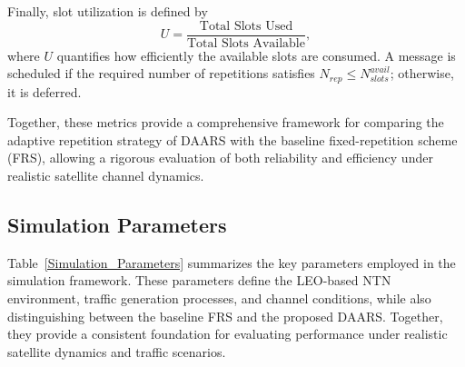 \documentclass[conference]{IEEEtran}
\begin{document}
Finally, slot utilization is defined by
\begin{equation}
U = \frac{\text{Total Slots Used}}{\text{Total Slots Available}},
\end{equation}
where $U$ quantifies how efficiently the available slots are consumed. A message is scheduled if the required number of repetitions satisfies $N_{rep} \leq N_{slots}^{avail}$; otherwise, it is deferred.

Together, these metrics provide a comprehensive framework for comparing the adaptive repetition strategy of DAARS with the baseline fixed-repetition scheme (FRS), allowing a rigorous evaluation of both reliability and efficiency under realistic satellite channel dynamics.

\subsection{Simulation Parameters}
\label{sec:simulation_parameters}

Table~\ref{Simulation_Parameters} summarizes the key parameters employed in the simulation framework. These parameters define the LEO-based NTN environment, traffic generation processes, and channel conditions, while also distinguishing between the baseline FRS and the proposed DAARS. Together, they provide a consistent foundation for evaluating performance under realistic satellite dynamics and traffic scenarios.
\end{document}
